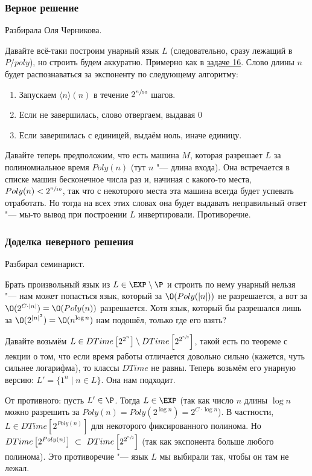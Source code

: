 	\subsubsection{Верное решение}
		Разбирала Оля Черникова.

		Давайте всё-таки построим унарный язык $L$ (следовательно, сразу лежащий в $P/poly$), но строить будем аккуратно.
		Примерно как в \hyperref[prob16]{задаче 16}.
		Слово длины $n$ будет распознаваться за экспоненту по следующему алгоритму:
		\begin{enumerate}
			\item
				Запускаем $\langle n \rangle (n)$ в течение $2^{\sfrac n {10}}$ шагов.
			\item
				Если не завершилась, слово отвергаем, выдавая 0
			\item
				Если завершилась с единицей, выдаём ноль, иначе единицу.
		\end{enumerate}
		Давайте теперь предположим, что есть машина $M$, которая разрешает $L$ за полиномиальное время $Poly(n)$ (тут $n$ "--- длина входа).
		Она встречается в списке машин бесконечное числа раз и, начиная с какого-то места,
		$Poly(n) < 2^{\sfrac n {10}}$, так что с некоторого места эта машина всегда будет успевать отработать.
		Но тогда на всех этих словах она будет выдавать неправильный ответ "--- мы-то вывод при построении $L$ инвертировали.
		Противоречие.

	\subsubsection{Доделка неверного решения}
		Разбирал семинарист.

		\begin{Rem}
			Брать произвольный язык из $L \in \EXP \setminus \P$ и строить по нему унарный
			нельзя "--- нам может попасться язык, который за $\O(Poly(|n|))$ не разрешается, а вот
			за $\O(2^{C\cdot|n|})=\O(Poly(n))$ разрешается.
			Хотя язык, который бы разрешался лишь за $\O(2^{|n|^2}) = \O(n^{\log n})$ нам подошёл, только где его взять?
		\end{Rem}

		Давайте возьмём $L \in DTime\left[2^{2^n}\right] \setminus DTime\left[2^{2^{\sfrac n2}}\right]$,
		такой есть по теореме с лекции о том, что если время работы отличается довольно
		сильно (кажется, чуть сильнее логарифма), то классы $DTime$ не равны.
		Теперь возьмём его унарную версию: $L' = \{ 1^n \mid n \in L\}$.
		Она нам подходит.

		От противного: пусть $L' \in \P$.
		Тогда $L \in \EXP$ (так как число $n$ длины $\log n$ можно разрешить за $Poly(n)=Poly(2^{\log n})=2^{C\cdot \log n}$).
		В частности, $L \in DTime\left[2^{Poly(n)}\right]$ для некоторого фиксированного полинома.
		Но $DTime\left[2^{Poly(n)}\right]~\subset~DTime\left[2^{2^{\sfrac n2}}\right]$ (так как экспонента больше любого полинома).
		Это противоречие "--- язык $L$ мы выбирали так, чтобы он там не лежал.

